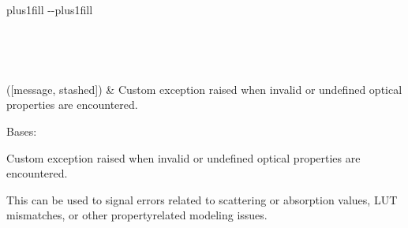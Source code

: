 \documentclass[letterpaper,10pt,english]{sphinxmanual}
\begin{document}
\begin{savenotes}
\sphinxatlongtablestart
\sphinxthistablewithglobalstyle
\sphinxthistablewithnovlinesstyle
\makeatletter
  \LTleft \@totalleftmargin plus1fill
  \LTright\dimexpr\columnwidth-\@totalleftmargin-\linewidth\relax plus1fill
\makeatother
\begin{longtable}{}
\sphinxtoprule
\endfirsthead

\\
\sphinxtoprule
\endhead

\sphinxbottomrule
{}\\
\endfoot

\endlastfoot
\sphinxtableatstartofbodyhook

\sphinxAtStartPar
{\hyperref[\detokenize{generated/photon_canon.utils:photon_canon.utils.OpticalPropertyError}]{}}({[}message, stashed{]})
&
\sphinxAtStartPar
Custom exception raised when invalid or undefined optical properties are encountered.
\\
\sphinxbottomrule
\end{longtable}
\sphinxtableafterendhook
\sphinxatlongtableend
\end{savenotes}

\begin{fulllineitems}
\label{\detokenize{generated/photon_canon.utils:photon_canon.utils.OpticalPropertyError}}
\pysigstartsignatures
\pysiglinewithargsret
{}
{\sphinxparamcomma {}}
{}
\pysigstopsignatures
\sphinxAtStartPar
Bases: 

\sphinxAtStartPar
Custom exception raised when invalid or undefined optical properties are encountered.

\sphinxAtStartPar
This can be used to signal errors related to scattering or absorption values, LUT mismatches,
or other property\sphinxhyphen{}related modeling issues.

\end{fulllineitems}
\end{document}
